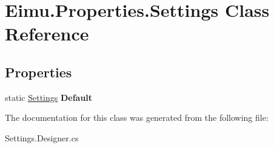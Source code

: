 \hypertarget{class_eimu_1_1_properties_1_1_settings}{
\section{Eimu.Properties.Settings Class Reference}
\label{class_eimu_1_1_properties_1_1_settings}
}
\subsection*{Properties}
\begin{DoxyCompactItemize}
\item 
\hypertarget{class_eimu_1_1_properties_1_1_settings_aaa24c2b994b9ebb58ee003462c5d65b8}{
static \hyperlink{class_eimu_1_1_properties_1_1_settings}{Settings} {\bfseries Default}}
\label{class_eimu_1_1_properties_1_1_settings_aaa24c2b994b9ebb58ee003462c5d65b8}

\end{DoxyCompactItemize}


The documentation for this class was generated from the following file:\begin{DoxyCompactItemize}
\item 
Settings.Designer.cs\end{DoxyCompactItemize}
